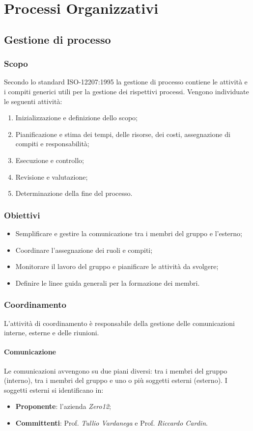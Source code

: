 \section{Processi Organizzativi}

\subsection{Gestione di processo}

\subsubsection{Scopo}
Secondo lo standard ISO-12207:1995 la gestione di processo contiene le attività e i compiti generici utili per la gestione dei rispettivi processi. Vengono individuate le seguenti attività:
\begin{enumerate}
\item Inizializzazione e definizione dello scopo;
\item Pianificazione e stima dei tempi, delle risorse, dei costi, assegnazione di compiti e responsabilità;
\item Esecuzione e controllo;
\item Revisione e valutazione;
\item Determinazione della fine del processo.
\end{enumerate}

\subsubsection{Obiettivi}
\begin{itemize}
\item Semplificare e gestire la comunicazione tra i membri del gruppo e l'esterno;
\item Coordinare l'assegnazione dei ruoli e compiti;
\item Monitorare il lavoro del gruppo e pianificare le attività da svolgere;
\item Definire le linee guida generali per la formazione dei membri.
\end{itemize}

\subsubsection{Coordinamento}
L'attività di coordinamento è responsabile della gestione delle comunicazioni interne, esterne e delle riunioni.


\paragraph{Comunicazione}
Le comunicazioni avvengono su due piani diversi: tra i membri del gruppo (interno), tra i membri del gruppo e uno o più soggetti esterni (esterno). I soggetti esterni si identificano in:
\begin{itemize}
\item \textbf{Proponente}: l'azienda \textit{Zero12};
\item \textbf{Committenti}:  Prof. \textit{Tullio Vardanega} e Prof. \textit{Riccardo Cardin}.
\end{itemize}

